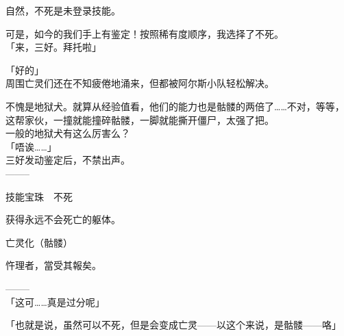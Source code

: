 自然，不死是未登录技能。

可是，如今的我们手上有鉴定！按照稀有度顺序，我选择了不死。\\

「来，三好。拜托啦」

「好的」\\

周围亡灵们还在不知疲倦地涌来，但都被阿尔斯小队轻松解决。

不愧是地狱犬。就算从经验值看，他们的能力也是骷髅的两倍了……不对，等等，这帮家伙，一撞就能撞碎骷髅，一脚就能撕开僵尸，太强了把。\\

一般的地狱犬有这么厉害么？\\

「唔诶……」\\

三好发动鉴定后，不禁出声。\\

  --------

  技能宝珠　不死

%  


  获得永远不会死亡的躯体。

  亡灵化（骷髅）

%  
 

  忤理者，當受其報矣。

  --------\\

「这可……真是过分呢」

「也就是说，虽然可以不死，但是会变成亡灵——以这个来说，是骷髅——咯」

